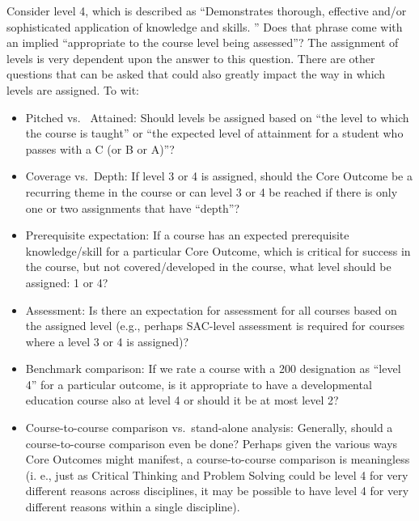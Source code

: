 Consider level 4, which is described as ``Demonstrates thorough, effective and/or sophisticated application of knowledge and skills.
''  Does that phrase come with an implied ``appropriate
to the course level being assessed''?
The assignment of levels is very dependent upon the answer to this question.
There are other questions that can be asked that could also greatly impact the way in which levels are assigned.
To wit: \begin{itemize} \item Pitched vs.
	      \ Attained: Should levels be assigned based on ``the level to
	      which the course is taught'' or ``the expected level of attainment for a
	      student who passes with a C (or B or A)''?

	\item Coverage vs.\ Depth: If level 3 or 4 is assigned, should the Core Outcome
	      be a recurring theme in the course or can level 3 or 4 be reached if there is
	      only one or two assignments that have ``depth''?

	\item Prerequisite expectation: If a course has an expected prerequisite
	      knowledge/skill for a particular Core Outcome, which is critical for success
	      in the course, but not covered/developed in the course, what level should be
	      assigned: 1 or 4?

	\item Assessment: Is there an expectation for assessment for all courses based
	      on the assigned level (e.g., perhaps SAC-level assessment is required for
	      courses where a level 3 or 4 is assigned)?

	\item Benchmark comparison: If we rate a course with a 200 designation as
	      ``level 4'' for a particular outcome, is it appropriate to have a
	      developmental education course also at level 4 or should it be at most level
	      2?

	\item Course-to-course comparison vs.\ stand-alone analysis: Generally, should
	      a course-to-course comparison even be done?
	      Perhaps given the various ways Core Outcomes might manifest, a course-to-course comparison is meaningless (i.
	      e., just as Critical Thinking and Problem Solving could be level 4 for
	      very different reasons across disciplines, it may be possible to have level 4
	      for very different reasons within a single discipline).
\end{itemize}

